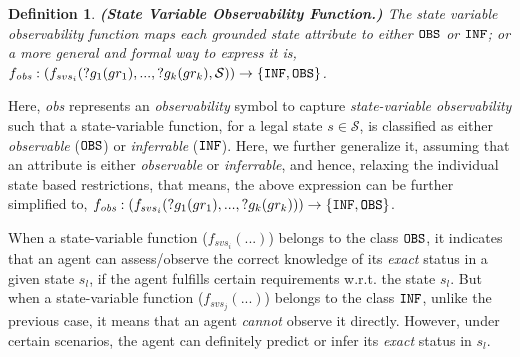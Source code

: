 \documentclass[letterpaper]{article} %
\newtheorem{definition}{Definition}
\begin{document}

\begin{definition}
\textbf{(State Variable Observability Function.)} 
The state variable observability function maps each grounded state attribute 
to either $\texttt{OBS}$ or $\texttt{INF}$; or a more general and formal way to express it is, $f_{\textit{obs}}: (f_{svs_i}(?g_1(gr_1),...,?g_k(gr_k),\mathcal{S}
)) \rightarrow 
    \{\texttt{INF}, \texttt{OBS}\}$.
    \label{def:svof}
\end{definition}
Here, \textit{obs} represents an \textit{observability} symbol to capture \textit{state-variable observability} such that a state-variable function, for a legal state $s\in\mathcal{S}$, is classified as either \textit{observable} ($\texttt{OBS}$) or \textit{inferrable} ($\texttt{INF}$). 
Here, we further generalize it, assuming that an attribute is either \textit{observable} or \textit{inferrable}, and hence, relaxing the individual state based restrictions, that means, the above expression can be further simplified to, $f_{\textit{obs}}: (f_{svs_i}(?g_1(gr_1),...,?g_k(gr_k))) \rightarrow 
    \{\texttt{INF}, \texttt{OBS}\}$.


When a state-variable function ($f_{svs_i}(...)$) belongs to the class $\texttt{OBS}$, it indicates that an agent can assess/observe the correct knowledge of its \textit{exact} status in a given state $s_l$, if the agent fulfills certain requirements w.r.t. the state $s_l$. 
But when a state-variable function ($f_{svs_j}(...)$) belongs to the class $\texttt{INF}$, unlike the previous case, it means that an agent \textit{cannot} observe it directly. However, under certain scenarios, the agent can definitely predict or infer its \textit{exact} status in $s_l$. 
\end{document}
